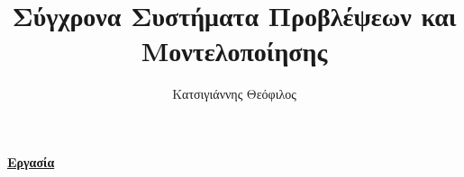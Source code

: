 \documentclass[a4paper,12pt]{article}
\title{Σύγχρονα Συστήματα Προβλέψεων και Μοντελοποίησης}
\author{Κατσιγιάννης Θεόφιλος}
\begin{document}
\maketitle
\begin{center}
\textbf{\underline{\large{Εργασία}}}
\end{center}
\end{document}
